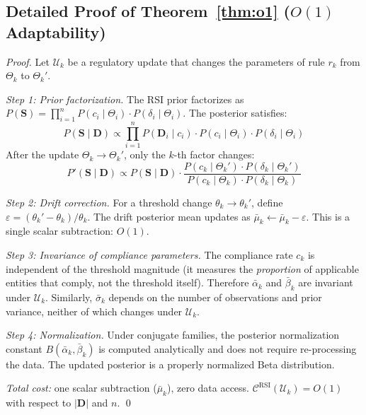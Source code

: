 
\subsection{Detailed Proof of Theorem~\ref{thm:o1} ($O(1)$ Adaptability)}

\begin{proof}
Let $\mathcal{U}_k$ be a regulatory update that changes the parameters
of rule $r_k$ from $\Theta_k$ to $\Theta_k'$.

\textit{Step 1: Prior factorization.}
The RSI prior factorizes as
$P(\mathbf{S}) = \prod_{i=1}^n P(c_i \mid \Theta_i) \cdot P(\delta_i \mid \Theta_i)$.
The posterior satisfies:
\[
  P(\mathbf{S} \mid \mathbf{D}) \propto
  \prod_{i=1}^n P(\mathbf{D}_i \mid c_i) \cdot P(c_i \mid \Theta_i) \cdot P(\delta_i \mid \Theta_i)
\]
After the update $\Theta_k \to \Theta_k'$, only the $k$-th factor
changes:
\[
  P'(\mathbf{S} \mid \mathbf{D}) \propto
  P(\mathbf{S} \mid \mathbf{D}) \cdot
  \frac{P(c_k \mid \Theta_k') \cdot P(\delta_k \mid \Theta_k')}
       {P(c_k \mid \Theta_k) \cdot P(\delta_k \mid \Theta_k)}
\]

\textit{Step 2: Drift correction.}
For a threshold change $\theta_k \to \theta_k'$, define
$\varepsilon = (\theta_k' - \theta_k)/\theta_k$. The drift posterior
mean updates as $\bar{\mu}_k \leftarrow \bar{\mu}_k - \varepsilon$.
This is a single scalar subtraction: $O(1)$.

\textit{Step 3: Invariance of compliance parameters.}
The compliance rate $c_k$ is independent of the threshold magnitude
(it measures the \emph{proportion} of applicable entities that comply,
not the threshold itself). Therefore $\bar{\alpha}_k$ and
$\bar{\beta}_k$ are invariant under $\mathcal{U}_k$. Similarly,
$\bar{\sigma}_k$ depends on the number of observations and prior
variance, neither of which changes under $\mathcal{U}_k$.

\textit{Step 4: Normalization.}
Under conjugate families, the posterior normalization constant
$B(\bar{\alpha}_k, \bar{\beta}_k)$ is computed analytically and does
not require re-processing the data. The updated posterior is a
properly normalized Beta distribution.

\textit{Total cost:} one scalar subtraction ($\bar{\mu}_k$), zero
data access. $\mathcal{C}^{\mathrm{RSI}}(\mathcal{U}_k) = O(1)$
with respect to $|\mathbf{D}|$ and $n$. \qed
\end{proof}

